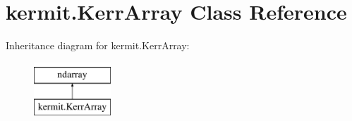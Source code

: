 \hypertarget{classkermit_1_1_kerr_array}{}\section{kermit.\+Kerr\+Array Class Reference}
\label{classkermit_1_1_kerr_array}
Inheritance diagram for kermit.\+Kerr\+Array\+:\begin{figure}[H]
\begin{center}
\leavevmode
\includegraphics[height=2.000000cm]{classkermit_1_1_kerr_array}
\end{center}
\end{figure}
